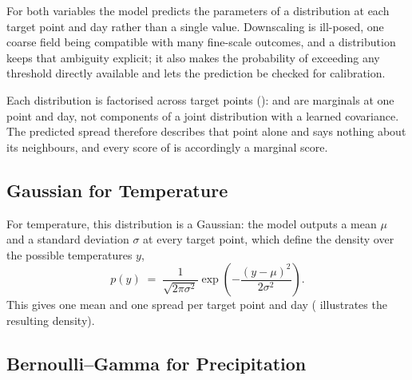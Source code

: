For both variables the model predicts the parameters of a distribution at each target point and day rather than a single value. Downscaling is ill-posed, one coarse field being compatible with many fine-scale outcomes, and a distribution keeps that ambiguity explicit; it also makes the probability of exceeding any threshold directly available and lets the prediction be checked for calibration.

Each distribution is factorised across target points ():  and  are marginals at one point and day, not components of a joint distribution with a learned covariance. The predicted spread therefore describes that point alone and says nothing about its neighbours, and every score of  is accordingly a marginal score.

\subsection{Gaussian for Temperature}\label{subsec:meth-gaussian}

For temperature, this distribution is a Gaussian: the model outputs a mean $\mu$ and a standard deviation $\sigma$ at every target point, which define the density over the possible temperatures $y$,
\begin{equation}
    p(y) \;=\; \frac{1}{\sqrt{2\pi\sigma^{2}}} \exp\!\left(-\frac{(y - \mu)^{2}}{2\sigma^{2}}\right).
\label{eq:gauss-density}
\end{equation}
This gives one mean and one spread per target point and day ( illustrates the resulting density).

\subsection{Bernoulli--Gamma for Precipitation}\label{subsec:meth-likelihoods}

